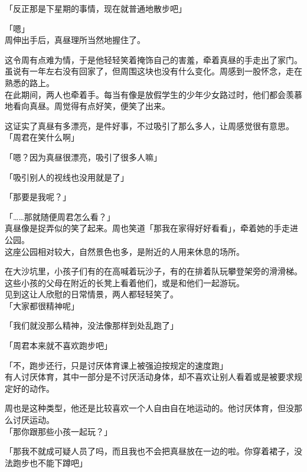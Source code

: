 「反正那是下星期的事情，现在就普通地散步吧」

「嗯」\\

周伸出手后，真昼理所当然地握住了。

这令周有点难为情，于是他轻轻笑着掩饰自己的害羞，牵着真昼的手走出了家门。\\

虽说有一年左右没有回家了，但周围这块也没有什么变化。周感到一股怀念，走在熟悉的路上。\\

在此期间，两人也牵着手。每当有像是放假学生的少年少女路过时，他们都会羡慕地看向真昼。周觉得有点好笑，便笑了出来。

这证实了真昼有多漂亮，是件好事，不过吸引了那么多人，让周感觉很有意思。\\

「周君在笑什么啊」

「嗯？因为真昼很漂亮，吸引了很多人嘛」

「吸引别人的视线也没用就是了」

「那要是我呢？」

「……那就随便周君怎么看？」\\

真昼像是捉弄似的笑了起来。周也笑道「那我在家得好好看看」，牵着她的手走进公园。\\

这座公园相对较大，自然景色也多，是附近的人用来休息的场所。

在大沙坑里，小孩子们有的在高喊着玩沙子，有的在排着队玩攀登架旁的滑滑梯。这些小孩的父母在附近的长凳上看着他们，或是和他们一起游玩。\\

见到这让人欣慰的日常情景，两人都轻轻笑了。\\

「大家都很精神呢」

「我们就没那么精神，没法像那样到处乱跑了」

「周君本来就不喜欢跑步吧」

「不，跑步还行，只是讨厌体育课上被强迫按规定的速度跑」\\

有人讨厌体育，其中一部分是不讨厌活动身体，却不喜欢让别人看着或是被要求规定好的动作。

周也是这种类型，他还是比较喜欢一个人自由自在地运动的。他讨厌体育，但没那么讨厌运动。\\

「那你跟那些小孩一起玩？」

「那我不就成可疑人员了吗，而且我也不会把真昼放在一边的啦。你穿着裙子，没法跑步也不能下蹲吧」


